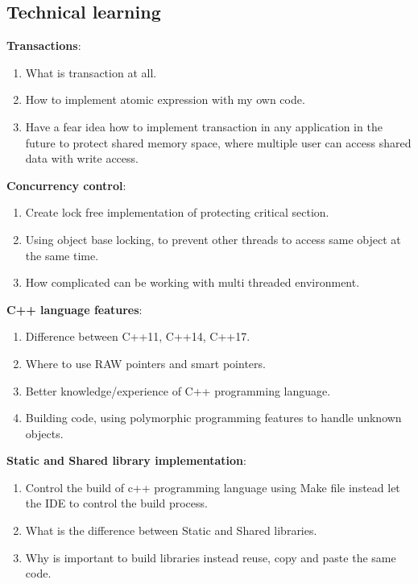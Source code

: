 \documentclass[12pt]{article}
\begin{document}
\subsection{Technical learning}
\textbf{Transactions}:
\begin{enumerate}
\item What is transaction at all. 
\item How to implement atomic expression with my own code.
\item Have a fear idea how to implement transaction in any application in the future to protect shared memory space, where multiple user can access shared data with write access.
\end{enumerate}
\textbf{Concurrency control}:
\begin{enumerate}
\item Create lock free implementation of protecting critical section. 
\item Using object base locking, to prevent other threads to access same object at the same time.
\item How complicated can be working with multi threaded environment.
\end{enumerate}
\textbf{C++ language features}:
\begin{enumerate}
\item Difference between C++11, C++14, C++17.
\item Where to use RAW pointers and smart pointers.
\item Better knowledge/experience of C++ programming language.
\item Building code, using polymorphic programming features to handle unknown objects.
\end{enumerate}
\textbf{Static and Shared library implementation}:
\begin{enumerate}
\item Control the build of c++ programming language using Make file instead let the IDE to control the build process.
\item What is the difference between Static and Shared libraries.
\item Why is important to build libraries instead reuse, copy and paste the same code.
\end{enumerate}
\end{document}
